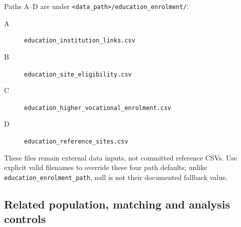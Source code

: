 \documentclass[11pt,a4paper]{article}
\newcommand{\code}[1]{\nolinkurl{#1}}
\begin{document}
Paths A--D are under \code{<data_path>/education_enrolment/}:
\begin{description}
\item[A] \code{education_institution_links.csv}
\item[B] \code{education_site_eligibility.csv}
\item[C] \code{education_higher_vocational_enrolment.csv}
\item[D] \code{education_reference_sites.csv}
\end{description}
These files remain external data inputs, not committed reference CSVs.
Use explicit valid filenames to override these four path defaults; unlike
\code{education_enrolment_path}, null is not their documented fallback value.

\subsection{Related population, matching and analysis controls}
\small
\end{document}
